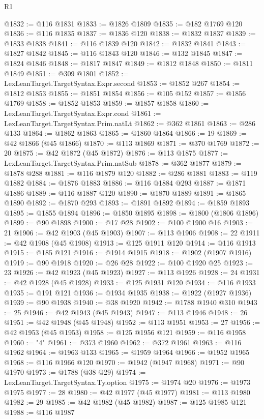 \begin{lexlean}{R1}
\begin{coremodule}
@1832 := @116 @1831
@1833 := @1826 @1809
@1835 := @182 @1769 @120
@1836 := @116 @1835
@1837 := @1836 @120
@1838 := @1832 @1837
@1839 := @1833 @1838
@1841 := @116 @1839 @120
@1842 := @1832 @1841
@1843 := @1827 @1842
@1845 := @116 @1843 @120
@1846 := @132 @1845
@1847 := @1824 @1846
@1848 := @1817 @1847
@1849 := @1812 @1848
@1850 := @1811 @1849
@1851 := @309 @1801
@1852 := LexLeanTarget.TargetSyntax.Expr.second
@1853 := @1852 @267
@1854 := @1812 @1853
@1855 := @1851 @1854
@1856 := @105 @152
@1857 := @1856 @1769
@1858 := @1852 @1853
@1859 := @1857 @1858
@1860 := LexLeanTarget.TargetSyntax.Expr.cond
@1861 := LexLeanTarget.TargetSyntax.Prim.natLt
@1862 := @362 @1861
@1863 := @286 @133
@1864 := @1862 @1863
@1865 := @1860 @1864
@1866 := 19
@1869 := @42 @1866 (@45 @1866)
@1870 := @113 @1869
@1871 := @370 @1769
@1872 := 20
@1875 := @42 @1872 (@45 @1872)
@1876 := @113 @1875
@1877 := LexLeanTarget.TargetSyntax.Prim.natSub
@1878 := @362 @1877
@1879 := @1878 @288
@1881 := @116 @1879 @120
@1882 := @286 @1881
@1883 := @119 @1882
@1884 := @1876 @1883
@1886 := @116 @1884 @293
@1887 := @1871 @1886
@1889 := @116 @1887 @120
@1890 := @1870 @1889
@1891 := @1865 @1890
@1892 := @1870 @293
@1893 := @1891 @1892
@1894 := @1859 @1893
@1895 := @1855 @1894
@1896 := @1850 @1895
@1898 := @1800 (@1806 @1896)
@1899 := @90 @1898
@1900 := @17 @28
@1902 := @100 @1900 @16
@1903 := 21
@1906 := @42 @1903 (@45 @1903)
@1907 := @113 @1906
@1908 := 22
@1911 := @42 @1908 (@45 @1908)
@1913 := @125 @1911 @120
@1914 := @116 @1913
@1915 := @185 @121
@1916 := @1914 @1915
@1918 := @1902 (@1907 @1916)
@1919 := @90 @1918
@1920 := @26 @28
@1922 := @100 @1920 @25
@1923 := 23
@1926 := @42 @1923 (@45 @1923)
@1927 := @113 @1926
@1928 := 24
@1931 := @42 @1928 (@45 @1928)
@1933 := @125 @1931 @120
@1934 := @116 @1933
@1935 := @191 @121
@1936 := @1934 @1935
@1938 := @1922 (@1927 @1936)
@1939 := @90 @1938
@1940 := @38 @1920
@1942 := @1788 @1940 @310
@1943 := 25
@1946 := @42 @1943 (@45 @1943)
@1947 := @113 @1946
@1948 := 26
@1951 := @42 @1948 (@45 @1948)
@1952 := @113 @1951
@1953 := 27
@1956 := @42 @1953 (@45 @1953)
@1958 := @125 @1956 @121
@1959 := @116 @1958
@1960 := "4"
@1961 := @373 @1960
@1962 := @372 @1961
@1963 := @116 @1962
@1964 := @1963 @133
@1965 := @1959 @1964
@1966 := @1952 @1965
@1968 := @116 @1966 @120
@1970 := @1942 (@1947 @1968)
@1971 := @90 @1970
@1973 := @1788 (@38 @29)
@1974 := LexLeanTarget.TargetSyntax.Ty.option
@1975 := @1974 @20
@1976 := @1973 @1975
@1977 := 28
@1980 := @42 @1977 (@45 @1977)
@1981 := @113 @1980
@1982 := 29
@1985 := @42 @1982 (@45 @1982)
@1987 := @125 @1985 @121
@1988 := @116 @1987

\end{coremodule}
\end{lexlean}
